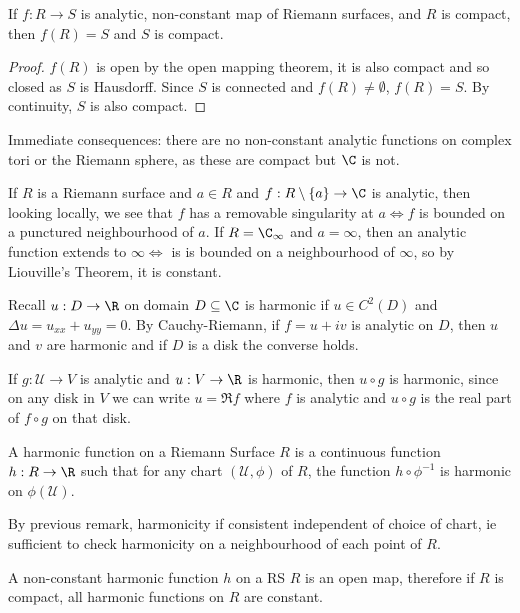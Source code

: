 \documentclass{article}
\begin{document}
\begin{cor}
    If $f: R\to S$ is analytic, non-constant map of Riemann surfaces, and $R$ is compact, then $f(R) = S$ and $S$ is compact.
\end{cor}

\begin{proof}
    $f(R)$ is open by the open mapping theorem, it is also compact and so closed as $S$ is Hausdorff. Since $S$ is connected and $f(R) \neq \emptyset$, $f(R) = S$. By continuity, $S$ is also compact.
\end{proof}

Immediate consequences: there are no non-constant analytic functions on complex tori or the Riemann sphere, as these are compact but $\C$ is not.

\begin{remark}
    If $R$ is a Riemann surface and $a \in R$ and $f: R \setminus \{a\} \to \C$ is analytic, then looking locally, we see that $f$ has a removable singularity at $a \iff  f$ is bounded on a punctured neighbourhood of $a$. If $R = \C_\infty$ and $a = \infty$, then an analytic function extends to $\infty \iff $ is is bounded on a neighbourhood of $\infty$, so by Liouville's Theorem, it is constant.
\end{remark}

Recall $u: D \to \R$ on domain $D \subseteq \C$ is harmonic if $u \in C^2(D)$ and $\Delta u = u_{xx} + u_{yy} = 0$. By Cauchy-Riemann, if $f = u + i v$ is analytic on $D$, then $u$ and $v$ are harmonic and if $D$ is a disk the converse holds.

\begin{remark}
    If $g: \mathcal{U} \to V$ is analytic and $u: V \to \R$ is harmonic, then $u \circ g$ is harmonic, since on any disk in $V$ we can write $u = \Re f$ where $f$ is analytic and $u \circ g$ is the real part of $f \circ g$ on that disk.
\end{remark}

\begin{defi}
    A harmonic function on a Riemann Surface $R$ is a continuous function $h: R \to \R$ such that for any chart $(\mathcal{U}, \phi)$ of $R$, the function $h \circ \phi^{-1}$ is harmonic on $\phi(\mathcal{U})$.
\end{defi}
By previous remark, harmonicity if consistent independent of choice of chart, ie sufficient to check harmonicity on a neighbourhood of each point of $R$.

\begin{prop}
    A non-constant harmonic function $h$ on a RS $R$ is an open map, therefore if $R$ is compact, all harmonic functions on $R$ are constant.
\end{prop}
\end{document}
